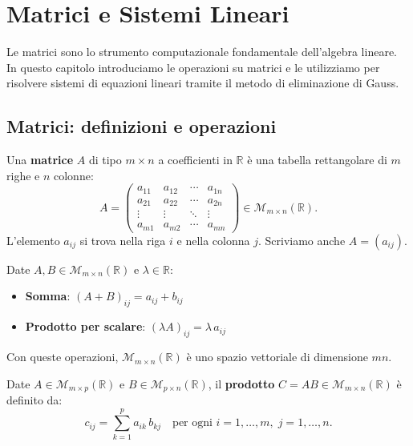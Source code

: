 \chapter[Matrici e Sistemi]{Matrici e Sistemi Lineari}
\label{ch:matrici-sistemi}

Le matrici sono lo strumento computazionale fondamentale dell'algebra lineare. In questo capitolo introduciamo le operazioni su matrici e le utilizziamo per risolvere sistemi di equazioni lineari tramite il metodo di eliminazione di Gauss.

\section{Matrici: definizioni e operazioni}
\label{sec:matrici-def}

\begin{definitionbox}[Matrice]
Una \textbf{matrice} $A$ di tipo $m \times n$ a coefficienti in $\mathbb{R}$ è una tabella rettangolare di $m$ righe e $n$ colonne:
\[ A = \begin{pmatrix} a_{11} & a_{12} & \cdots & a_{1n} \\ a_{21} & a_{22} & \cdots & a_{2n} \\ \vdots & \vdots & \ddots & \vdots \\ a_{m1} & a_{m2} & \cdots & a_{mn} \end{pmatrix} \in \mathcal{M}_{m \times n}(\mathbb{R}). \]
L'elemento $a_{ij}$ si trova nella riga $i$ e nella colonna $j$. Scriviamo anche $A = (a_{ij})$.
\end{definitionbox}

\begin{definitionbox}
Date $A, B \in \mathcal{M}_{m \times n}(\mathbb{R})$ e $\lambda \in \mathbb{R}$:
\begin{itemize}
    \item \textbf{Somma}: $(A + B)_{ij} = a_{ij} + b_{ij}$
    \item \textbf{Prodotto per scalare}: $(\lambda A)_{ij} = \lambda \, a_{ij}$
\end{itemize}
Con queste operazioni, $\mathcal{M}_{m \times n}(\mathbb{R})$ è uno spazio vettoriale di dimensione $mn$.
\end{definitionbox}

\begin{definitionbox}
\label{def:prodotto-matrici}
Date $A \in \mathcal{M}_{m \times p}(\mathbb{R})$ e $B \in \mathcal{M}_{p \times n}(\mathbb{R})$, il \textbf{prodotto} $C = AB \in \mathcal{M}_{m \times n}(\mathbb{R})$ è definito da:
\[ c_{ij} = \sum_{k=1}^{p} a_{ik} \, b_{kj} \quad \text{per ogni } i = 1, \ldots, m, \; j = 1, \ldots, n. \]
\end{definitionbox}


